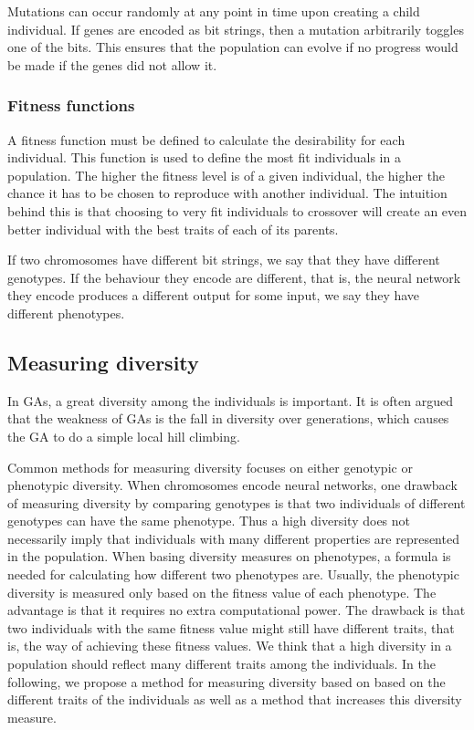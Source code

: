 
Mutations can occur randomly at any point in time upon creating a child individual. If genes are encoded as bit strings, then a mutation arbitrarily toggles one of the bits. This ensures that the population can evolve if no progress would be made if the genes did not allow it.

\subsubsection{Fitness functions}
A fitness function must be defined to calculate the desirability for each individual. This function is used to define the most fit individuals in a population. The higher the fitness level is of a given individual, the higher the chance it has to be chosen to reproduce with another individual. The intuition behind this is that choosing to very fit individuals to crossover will create an even better individual with the best traits of each of its parents.



If two chromosomes have different bit strings, we say that they have different genotypes.
If the behaviour they encode are different, that is, the neural network they encode produces a different output for some input,  we say they have different phenotypes.

\subsection{Measuring diversity}
In GAs, a great diversity among the individuals is important.
It is often argued that the weakness of GAs is the fall in diversity over generations, which causes the GA to do a simple local hill climbing.

Common methods for measuring diversity focuses on either genotypic or phenotypic diversity.
When chromosomes encode neural networks, one drawback of measuring diversity by comparing genotypes is that two individuals of different genotypes can have the same phenotype. Thus a high diversity does not necessarily imply that individuals with many different properties are represented in the population.
When basing diversity measures on phenotypes, a formula is needed for calculating how different two phenotypes are. 
Usually, the phenotypic diversity is measured only based on the fitness value of each phenotype.
The advantage is that it requires no extra computational power. 
The drawback is that two individuals with the same fitness value might still have different traits, that is, the way of achieving these fitness values. We think that a high diversity in a population should reflect many different traits among the individuals. In the following, we propose a method for measuring diversity based on based on the different traits of the individuals as well as a method that increases this diversity measure. 
